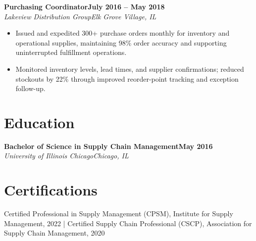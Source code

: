 \documentclass[10pt,letterpaper]{article}
\newcommand{\job}[4]{%
  \textbf{#1}\hfill\textbf{#2}\\[-1pt]
  \textit{#3}\hfill\textit{#4}\par
}
\begin{document}
\job{Purchasing Coordinator}{July 2016 -- May 2018}{Lakeview Distribution Group}{Elk Grove Village, IL}
\begin{itemize}
  \item Issued and expedited 300+ purchase orders monthly for inventory and operational supplies, maintaining 98\% order accuracy and supporting uninterrupted fulfillment operations.
  \item Monitored inventory levels, lead times, and supplier confirmations; reduced stockouts by 22\% through improved reorder-point tracking and exception follow-up.
\end{itemize}

\section*{Education}
\textbf{Bachelor of Science in Supply Chain Management}\hfill\textbf{May 2016}\\[-1pt]
\textit{University of Illinois Chicago}\hfill\textit{Chicago, IL}

\section*{Certifications}
Certified Professional in Supply Management (CPSM), Institute for Supply Management, 2022 \;|\;
Certified Supply Chain Professional (CSCP), Association for Supply Chain Management, 2020
\end{document}
